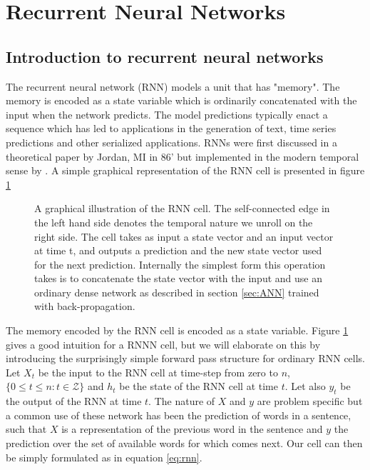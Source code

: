 
\section{Recurrent Neural Networks}\label{sec:rnn}

\subsection{Introduction to recurrent neural networks}

The recurrent neural network (RNN) models a unit that has "memory". The memory is encoded as a state variable which is ordinarily concatenated with the input when the network predicts. The model predictions typically enact a sequence which has led to applications in the generation of text, time series predictions and other serialized applications. RNNs were first discussed in a theoretical paper by Jordan, MI in 86' but implemented in the modern temporal sense by \citet{Pearlmutter1989}. A simple graphical representation of the RNN cell is presented in figure \ref{fig:rnn}

\begin{figure}[h]
\centering
{} %

\caption[Recurrent neural network cell]{A graphical illustration of the RNN cell. The self-connected edge in the left hand side denotes the temporal nature we unroll on the right side. The cell takes as input a state vector and an input vector at time t, and outputs a prediction and the new state vector used for the next prediction. Internally the simplest form this operation takes is to concatenate the state vector with the input and use an ordinary dense network as described in section \ref{sec:ANN} trained with back-propagation.}\label{fig:rnn}
\end{figure}

The memory encoded by the RNN cell is encoded as a state variable. Figure \ref{fig:rnn} gives a good intuition for a RNNN cell, but we will elaborate on this by introducing the surprisingly simple forward pass structure for ordinary RNN cells. Let $X_t$ be the input to the RNN cell at time-step from zero to $n$, $\{0 \leq t \leq n: t \in \mathcal{Z} \}$ and $h_t$ be the state of the RNN cell at time $t$. Let also $y_t$ be the output of the RNN at time $t$. The nature of $X$ and $y$ are problem specific but a common use of these network has been the prediction of words in a sentence, such that $X$ is a representation of the previous word in the sentence and $y$ the prediction over the set of available words for which comes next. Our cell can then be simply formulated as in equation \ref{eq:rnn}.


